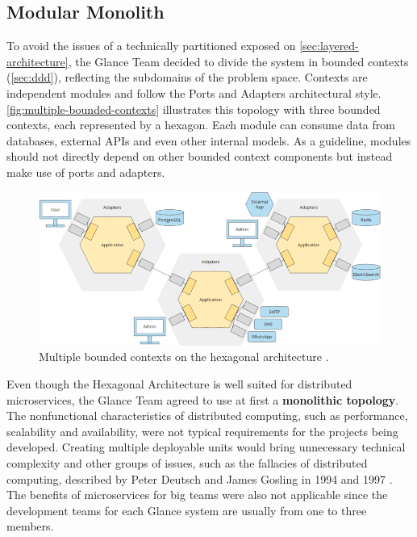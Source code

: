 \subsection{Modular Monolith}
\label{sec:modular-monolith}

To avoid the issues of a technically partitioned exposed on \autoref{sec:layered-architecture}, the Glance Team decided to divide the system in bounded contexts (\autoref{sec:ddd}), reflecting the subdomains of the problem space. Contexts are independent modules and follow the Ports and Adapters architectural style. \autoref{fig:multiple-bounded-contexts} illustrates this topology with three bounded contexts, each represented by a hexagon. Each module can consume data from databases, external APIs and even other internal models. As a guideline, modules should not directly depend on other bounded context components but instead make use of ports and adapters. 

\begin{figure}[htbp]
  \centering
  \includegraphics[scale=0.5]{Imagens/chap04/multiple-bounded-contexts.png}
  \caption{Multiple bounded contexts on the hexagonal architecture \cite{sven-woltmann-hexagonal-architecture}.}
  \label{fig:multiple-bounded-contexts}
\end{figure}

Even though the Hexagonal Architecture is well suited for distributed microservices, the Glance Team agreed to use at first a \textbf{monolithic topology}. The nonfunctional characteristics of distributed computing, such as performance, scalability and availability, were not typical requirements for the projects being developed. Creating multiple deployable units would bring unnecessary technical complexity and other groups of issues, such as the fallacies of distributed computing, described by Peter Deutsch and James Gosling in 1994 and 1997 \cite{fallacies-of-distributed-computing} \cite{richards-architecture}. The benefits of microservices for big teams were also not applicable since the development teams for each Glance system are usually from one to three members.

